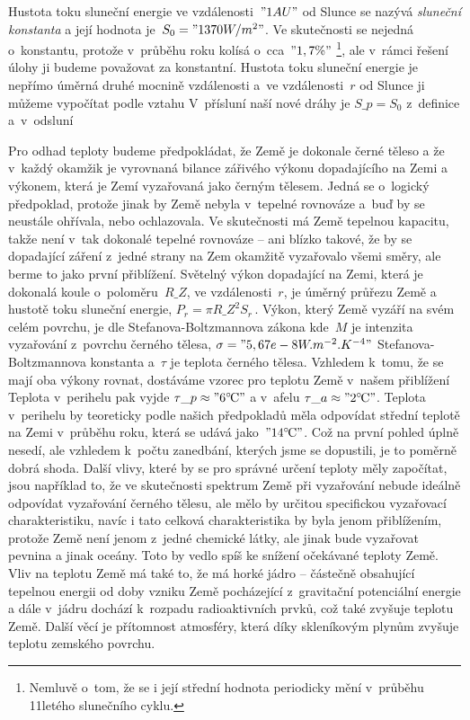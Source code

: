 \documentclass[twoside]{fksserie}
\begin{document}
Hustota toku sluneční energie ve vzdálenosti~$"1 AU"$ od Slunce se
nazývá {\it sluneční konstanta} a její hodnota je~$S_0 = "1370 W/m^2"$. Ve 
skutečnosti se nejedná o~konstantu, protože v~průběhu roku kolísá
o~cca~$"1,7 \%"$%
\footnote{Nemluvě o~tom, že se i její střední hodnota 
periodicky mění v~průběhu 11letého slunečního cyklu.},
ale v~rámci řešení úlohy
ji budeme považovat za konstantní. Hustota toku sluneční energie je 
nepřímo úměrná druhé mocnině vzdálenosti a~ve vzdálenosti~$r$ od 
Slunce ji můžeme vypočítat podle vztahu
V~přísluní naší nové dráhy je $S\_p = S_0$ z~definice a~v~odsluní

Pro odhad teploty budeme předpokládat, že Země je dokonale černé 
těleso a že v~každý okamžik je vyrovnaná bilance zářivého výkonu 
dopadajícího na Zemi a výkonem, která je Zemí vyzařovaná jako 
černým tělesem. Jedná se o~logický předpoklad, protože jinak by Země
nebyla v~tepelné rovnováze a~buď by se neustále ohřívala, nebo 
ochlazovala. Ve skutečnosti má Země tepelnou kapacitu, takže není 
v~tak dokonalé tepelné rovnováze -- ani blízko takové, že by se 
dopadající záření z~jedné strany na Zem okamžitě vyzařovalo všemi 
směry, ale berme to jako první přiblížení. Světelný výkon dopadající
na Zemi, která je dokonalá koule o~poloměru~$R\_Z$, ve vzdálenosti~$r$,
je úměrný průřezu Země a hustotě toku sluneční energie, $
P_r = \pi R\_Z^2 S_r \,.  
$
Výkon, který Země vyzáří na svém celém povrchu, je dle 
Stefanova-Boltzmannova zákona 
kde~$M$ je intenzita vyzařování z~povrchu černého tělesa, $\sigma
= "5,67e-8 W.m^{-2}.K^{-4}"$ Stefanova-Boltzmannova konstanta 
a~$\tau$ je teplota černého tělesa. Vzhledem k~tomu, že se mají 
oba výkony rovnat, dostáváme vzorec pro teplotu Země v~našem přiblížení
Teplota v~perihelu pak vyjde $\tau\_p \approx "6 ^\circ\mskip-2mu\mathrm{C}"$ a v~afelu $\tau\_a \approx
"2 ^\circ\mskip-2mu\mathrm{C}"$. Teplota v~perihelu by teoreticky podle našich předpokladů
měla odpovídat střední teplotě na Zemi v~průběhu roku, která se udává
jako~$"14 ^\circ\mskip-2mu\mathrm{C}"$. Což na první pohled úplně nesedí, ale vzhledem k~počtu
zanedbání, kterých jsme se dopustili, je to poměrně dobrá shoda. Další 
vlivy, které by se pro správné určení teploty měly započítat, jsou 
například to, že ve skutečnosti spektrum Země při vyzařování nebude 
ideálně odpovídat vyzařování černého tělesu, ale mělo by určitou 
specifickou vyzařovací charakteristiku, navíc i tato celková 
charakteristika by byla jenom přiblížením, protože Země není jenom 
z~jedné chemické látky, ale jinak bude vyzařovat pevnina a jinak 
oceány. Toto by vedlo spíš ke snížení očekávané teploty Země. Vliv na
teplotu Země má také to, že má horké jádro -- částečně obsahující 
tepelnou energii od doby vzniku Země pocházející z~gravitační
potenciální energie a dále v~jádru dochází k~rozpadu radioaktivních 
prvků, což také zvyšuje teplotu Země.
Další věcí je přítomnost atmosféry, která díky skleníkovým
plynům zvyšuje teplotu zemského povrchu.
\end{document}
